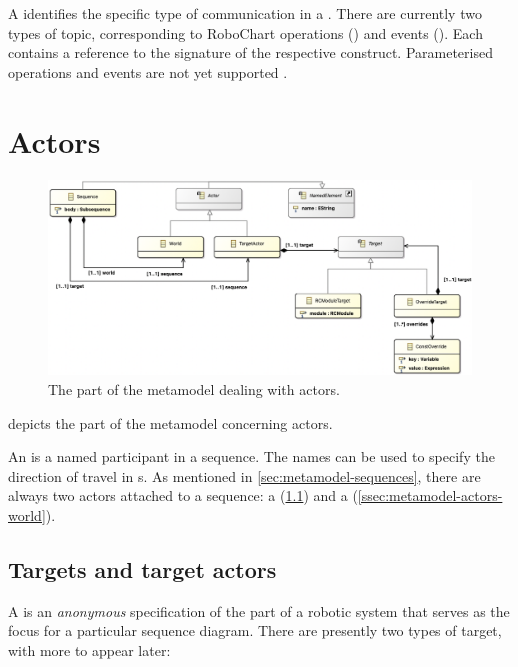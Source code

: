 A \mmessagetopic{} identifies the specific type of communication in a
\mmessagespec{}.  There are currently two types of topic, corresponding to
RoboChart operations (\moperationmessagetopic) and events (\meventmessagetopic).
Each contains a reference to the signature of the respective construct.
Parameterised operations and events are not yet supported .


\section{Actors}\label{sec:metamodel-actors}

\begin{figure}
	\centering
	\includegraphics[width=\textwidth]{diagrams/actors.png}
	\caption{The part of the \langname{} metamodel dealing with actors.}
	\label{fig:metamodel-actors}
\end{figure}

 depicts the part of the metamodel concerning
actors.

An \mactor{} is a named participant in a sequence.  The names can be used to
specify the direction of travel in \mmessagespec{}s.
As mentioned in
\cref{sec:metamodel-sequences}, there are always two actors
attached to a sequence: a \mtargetactor{} (\cref{ssec:metamodel-actors-target})
and a \mworld{} (\cref{ssec:metamodel-actors-world}).

\subsection{Targets and target actors}\label{ssec:metamodel-actors-target}

A \mtarget{} is an \emph{anonymous} specification of the part of a robotic
system that serves as the focus for a particular sequence diagram.  There are
presently two types of target, with more to appear later:

